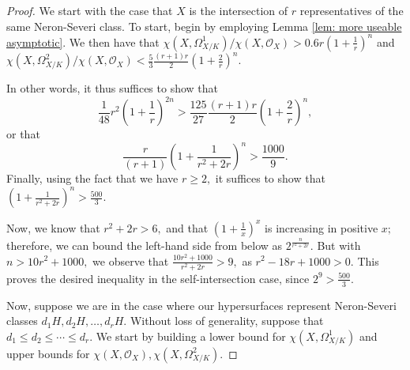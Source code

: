 \documentclass[10pt,a4paper]{amsart}
\begin{document}
\begin{proof}
We start with the case that $X$ is the intersection of $r$ representatives of the same Neron-Severi class. To start, begin by employing Lemma \ref{lem: more useable asymptotic}. We then have that $\chi(X, \Omega^1_{X/K})/\chi(X, \mathcal{O}_X) > 0.6 r \left( 1 + \frac{1}{r}\right)^n$ and $\chi(X, \Omega^2_{X/K})/\chi(X, \mathcal{O}_X) < \frac{5}{3} \frac{(r+1)r}{2} \left(1 + \frac{2}{r} \right)^n.$ 
\par In other words, it thus suffices to show that \[\frac{1}{48} r^2 \left( 1 + \frac{1}{r}\right)^{2n} > \frac{125}{27} \frac{(r+1)r}{2} \left(1 + \frac{2}{r}\right)^n,\] or that \[\frac{r}{(r+1)} \left(1 + \frac{1}{r^2 + 2r}\right)^n > \frac{1000}{9}.\] Finally, using the fact that we have $r \geq 2,$ it suffices to show that $\left(1 + \frac{1}{r^2 + 2r}\right)^n > \frac{500}{3}.$
\par Now, we know that $r^2 + 2r > 6,$ and that $(1+\frac{1}{x})^x$ is increasing in positive $x;$ therefore, we can bound the left-hand side from below as $2^{\frac{n}{r^2 + 2r}}.$ But with $n > 10r^2 + 1000,$ we observe that $\frac{10r^2 + 1000}{r^2 + 2r} > 9,$ as $r^2 - 18r + 1000 > 0.$ This proves the desired inequality in the self-intersection case, since $2^9 > \frac{500}{3}.$
\par Now, suppose we are in the case where our hypersurfaces represent Neron-Severi classes $d_1H, d_2H, \ldots, d_rH.$ Without loss of generality, suppose that $d_1 \leq d_2 \leq \cdots \leq d_r.$ We start by building a lower bound for $\chi(X, \Omega^1_{X/K})$ and upper bounds for $\chi(X, \mathcal{O}_X), \chi(X, \Omega^2_{X/K}).$

\end{proof}
\end{document}
